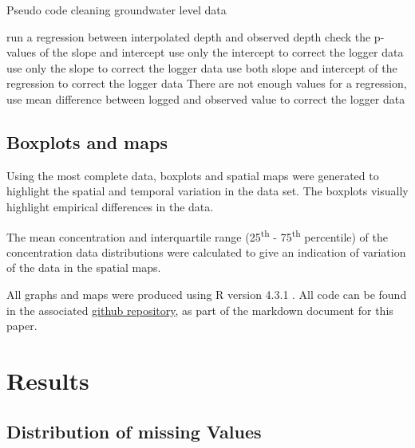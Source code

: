 \documentclass[, manuscript]{copernicus}
\begin{document}
\begin{algorithm}
\caption{Pseudo code cleaning groundwater level data}
\label{pseudocode}
\begin{algorithmic}
        \STATE run a regression between interpolated depth and observed depth  
        \STATE check the p-values of the slope and intercept
                \STATE  use only the intercept to correct the logger data
        \ELSE
                        \STATE use only the slope to correct the logger data
                \ELSE
                       \STATE use both slope and intercept of the regression to correct the logger data
                \ENDIF
        \ENDIF
\ELSE
        \STATE There are not enough values for a regression, use mean difference between logged and observed value to correct the logger data
\ENDIF
\end{algorithmic}
\end{algorithm}

\clearpage

\subsection{Boxplots and maps}

Using the most complete data, boxplots and spatial maps were generated
to highlight the spatial and temporal variation in the data set. The
boxplots visually highlight empirical differences in the data.

The mean concentration and interquartile range (25\textsuperscript{th} -
75\textsuperscript{th} percentile) of the concentration data
distributions were calculated to give an indication of variation of the
data in the spatial maps.

All graphs and maps were produced using R version 4.3.1 \citep{R2023}.
All code can be found in the associated
\href{https://github.com/WillemVervoort/MuttamaDataPaper}{github
repository}, as part of the markdown document for this paper.

\section{Results}

\subsection{Distribution of missing Values}
\end{document}

